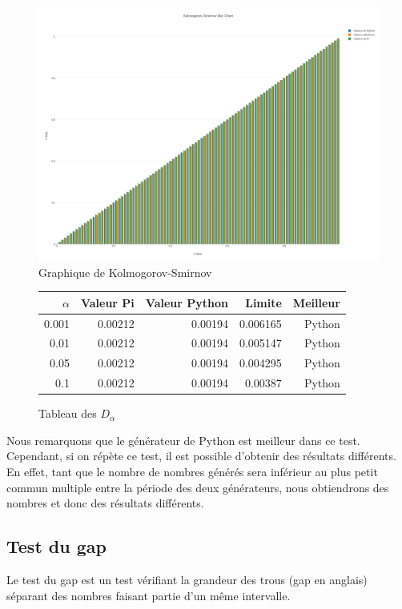 \documentclass[10pt,a4paper]{article}
\begin{document}
	\begin{figure}[h]
		\centering
		\includegraphics[scale=0.25]{../chart_images/kolmogorov-smirnov_bar_chart.png}
		\caption{Graphique de Kolmogorov-Smirnov}
	\end{figure}
	
	\begin{figure}[h]
		\centering
		\begin{tabular}{|r|r|r|r|r|}
			\hline
			$\alpha$ & Valeur Pi & Valeur Python & Limite & Meilleur\\
			\hline
			0.001 & 0.00212 & 0.00194 & 0.006165 & Python\\
			0.01 & 0.00212 & 0.00194 & 0.005147 & Python\\
			0.05 & 0.00212 & 0.00194 & 0.004295 & Python\\
			0.1 & 0.00212 & 0.00194 & 0.00387 & Python\\
			\hline
		\end{tabular}
		\caption{Tableau des $D_\alpha$}
	\end{figure}
	
	\newpage
	Nous remarquons que le générateur de Python est meilleur dans ce test.
	Cependant, si on répète ce test, il est possible d'obtenir des résultats différents.
	En effet, tant que le nombre de nombres générés sera inférieur au plus petit commun multiple entre la période des deux générateurs, nous obtiendrons des nombres et donc des résultats différents.
	
	
\newpage
\subsection{Test du gap}
Le test du gap est un test vérifiant la grandeur des trous (gap en anglais) séparant des nombres faisant partie d'un même intervalle.
\end{document}
